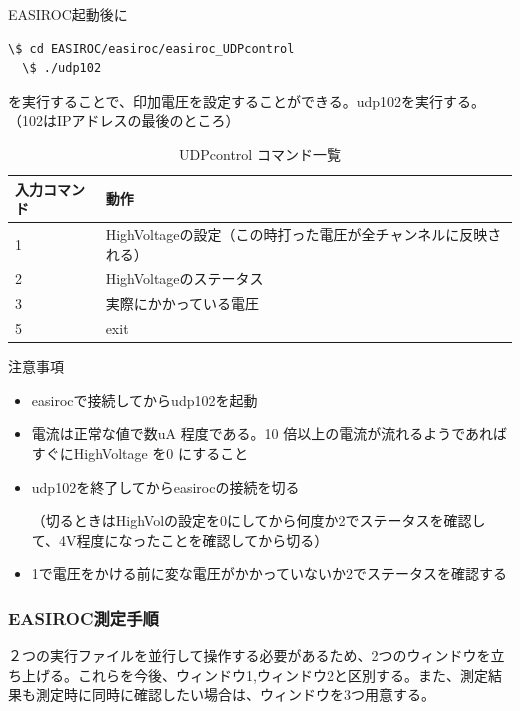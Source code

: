 \documentclass[uplatex,10pt,a4j]{jsarticle}
\begin{document}
EASIROC起動後に
\begin{lstlisting}[caption=印加電圧の設定]
  \$ cd EASIROC/easiroc/easiroc_UDPcontrol
  \$ ./udp102
\end{lstlisting}
を実行することで、印加電圧を設定することができる。udp102を実行する。（102はIPアドレスの最後のところ）
\begin{table}[htbp]
  \begin{center}
    \caption{UDPcontrol コマンド一覧}
    \begin{tabular}{|l|l|} \hline
      入力コマンド & 動作                                                            \\ \hline \hline
      1            & HighVoltageの設定（この時打った電圧が全チャンネルに反映される） \\ \hline
      2            & HighVoltageのステータス                                         \\ \hline
      3            & 実際にかかっている電圧                                          \\ \hline
      5            & exit                                                            \\ \hline
    \end{tabular}
  \end{center}
\end{table}

\begin{itembox}[l]{注意事項}
  \begin{itemize}
    \item easirocで接続してからudp102を起動
    \item 電流は正常な値で数uA 程度である。10 倍以上の電流が流れるようであればすぐにHighVoltage を0 にすること
    \item udp102を終了してからeasirocの接続を切る\par
          （切るときはHighVolの設定を0にしてから何度か2でステータスを確認して、4V程度になったことを確認してから切る）
    \item 1で電圧をかける前に変な電圧がかかっていないか2でステータスを確認する
  \end{itemize}
\end{itembox}

\subsubsection{EASIROC測定手順}

２つの実行ファイルを並行して操作する必要があるため、2つのウィンドウを立ち上げる。これらを今後、ウィンドウ1,ウィンドウ2と区別する。また、測定結果も測定時に同時に確認したい場合は、ウィンドウを3つ用意する。
\end{document}
